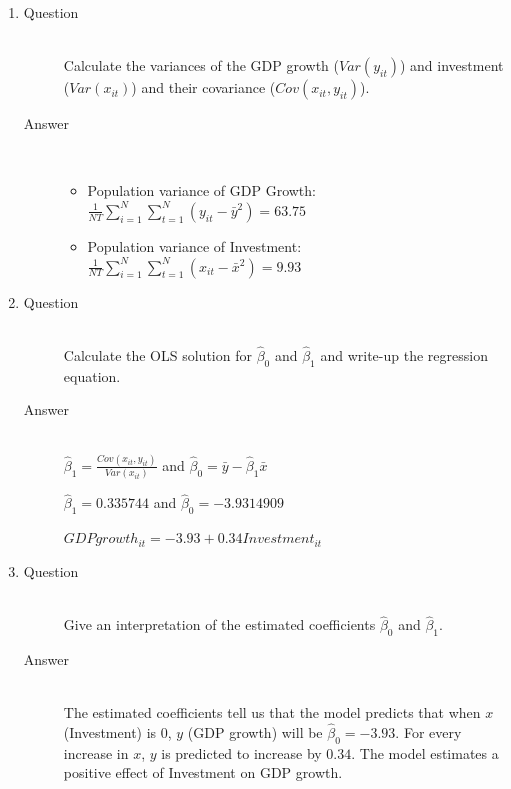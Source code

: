 \documentclass{article}
\begin{document}
\begin{enumerate}
  \item
  \begin{description}
    \item[Question] \hfill \\
    Calculate the variances of the GDP growth ($Var(y_{it})$) and investment ($Var(x_{it})$) and their covariance ($Cov(x_{it},y_{it})$).
    \item[Answer] \hfill \\
    \begin{itemize}
      \item Population variance of GDP Growth: $\frac{1}{NT} \sum^{N}_{i=1} \sum^{N}_{t=1} (y_{it}-\bar{y}^{2}) = 63.75$
      \item Population variance of Investment: $\frac{1}{NT} \sum^{N}_{i=1} \sum^{N}_{t=1} (x_{it}-\bar{x}^{2}) = 9.93$
    \end{itemize}
  \end{description}
  
  \item
  \begin{description}
    \item[Question] \hfill \\
    Calculate the OLS solution for $\hat{\beta}_{0}$ and $\hat{\beta}_{1}$ and write-up the regression equation.
    \item[Answer] \hfill \\
    $\hat{\beta}_{1} = \frac{Cov(x_{it},y_{it})}{Var(x_{it})}$ and $\hat{\beta}_{0} = \bar{y} - \hat{\beta}_{1}\bar{x}$
    
    $\hat{\beta}_{1} = 0.335744$ and $\hat{\beta}_{0} = -3.9314909$
    
    $GDPgrowth_{it} = -3.93 + 0.34Investment_{it}$
  \end{description}
  
  \item
  \begin{description}
    \item[Question] \hfill \\
    Give an interpretation of the estimated coefficients $\hat{\beta}_{0}$ and $\hat{\beta}_{1}$.
    \item[Answer] \hfill \\
    The estimated coefficients tell us that the model predicts that when $x$ (Investment) is 0, $y$ (GDP growth) will be $\hat{\beta}_{0} = -3.93$. For every increase in $x$, $y$ is predicted to increase by $0.34$. The model estimates a positive effect of Investment on GDP growth.
  \end{description}
  

\end{enumerate}
\end{document}
